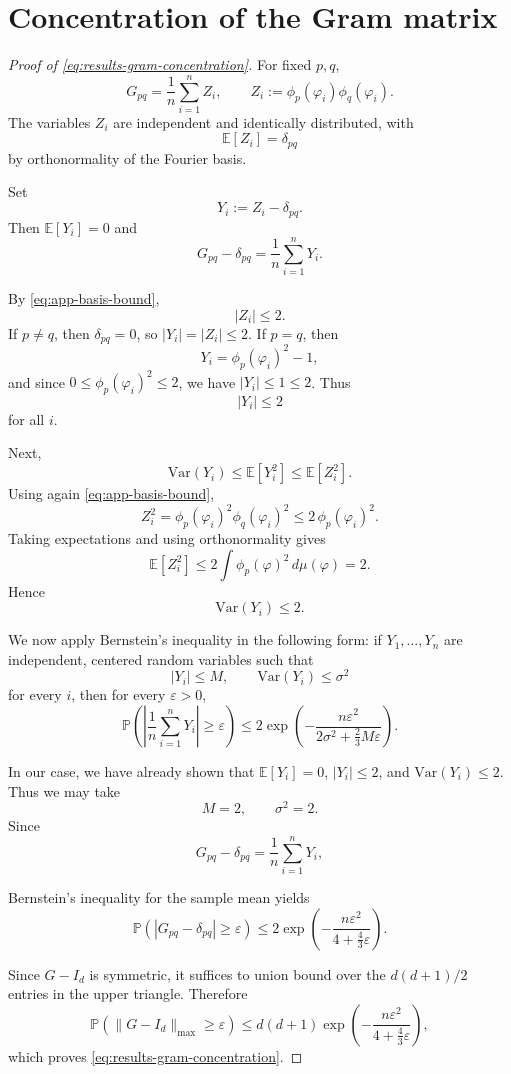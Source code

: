 \section{Concentration of the Gram matrix}
\label{sec:app-gram-proof}

\begin{proof}[Proof of \eqref{eq:results-gram-concentration}]
	For fixed \(p,q\),
	\[
		G_{pq}
		=
		\frac{1}{n}\sum_{i=1}^n Z_i,
		\qquad
		Z_i:=\phi_p(\varphi_i)\phi_q(\varphi_i).
	\]
	The variables \(Z_i\) are independent and identically distributed, with
	\[
		\mathbb E[Z_i]=\delta_{pq}
	\]
	by orthonormality of the Fourier basis.

	Set
	\[
		Y_i:=Z_i-\delta_{pq}.
	\]
	Then \(\mathbb E[Y_i]=0\) and
	\[
		G_{pq}-\delta_{pq}=\frac{1}{n}\sum_{i=1}^n Y_i.
	\]

	By \eqref{eq:app-basis-bound},
	\[
		|Z_i|\le 2.
	\]
	If \(p\neq q\), then \(\delta_{pq}=0\), so \(|Y_i|=|Z_i|\le 2\). If \(p=q\), then
	\[
		Y_i=\phi_p(\varphi_i)^2-1,
	\]
	and since \(0\le \phi_p(\varphi_i)^2\le 2\), we have \(|Y_i|\le 1\le 2\). Thus
	\[
		|Y_i|\le 2
	\]
	for all \(i\).

	Next,
	\[
		\mathrm{Var}(Y_i)\le \mathbb E[Y_i^2]\le \mathbb E[Z_i^2].
	\]
	Using again \eqref{eq:app-basis-bound},
	\[
		Z_i^2=\phi_p(\varphi_i)^2\phi_q(\varphi_i)^2\le 2\,\phi_p(\varphi_i)^2.
	\]
	Taking expectations and using orthonormality gives
	\[
		\mathbb E[Z_i^2]\le 2\int \phi_p(\varphi)^2\,d\mu(\varphi)=2.
	\]
	Hence
	\[
		\mathrm{Var}(Y_i)\le 2.
	\]

	We now apply Bernstein's inequality \cite{Vershynin_2018a} in the following form: if \(Y_1,\dots,Y_n\) are independent,
	centered random variables such that
	\[
		|Y_i|\le M,
		\qquad
		\mathrm{Var}(Y_i)\le \sigma^2
	\]
	for every \(i\), then for every \(\varepsilon>0\),
	\[
		\mathbb P\!\left(
		\left|\frac{1}{n}\sum_{i=1}^n Y_i\right|
		\ge \varepsilon
		\right)
		\le
		2\exp\!\left(
		-\frac{n\varepsilon^2}{2\sigma^2+\frac{2}{3}M\varepsilon}
		\right).
	\]

	In our case, we have already shown that \(\mathbb E[Y_i]=0\), \(|Y_i|\le 2\), and
	\(\mathrm{Var}(Y_i)\le 2\). Thus we may take
	\[
		M=2,
		\qquad
		\sigma^2=2.
	\]
	Since
	\[
		G_{pq}-\delta_{pq}=\frac{1}{n}\sum_{i=1}^n Y_i,
	\]

	Bernstein's inequality for the sample mean yields
	\[
		\mathbb P\!\left(|G_{pq}-\delta_{pq}|\ge \varepsilon\right)
		\le
		2\exp\!\left(
		-\frac{n\varepsilon^2}{4+\frac43\varepsilon}
		\right).
	\]

	Since \(G-I_d\) is symmetric, it suffices to union bound over the \(d(d+1)/2\) entries in
	the upper triangle. Therefore
	\[
		\mathbb P\!\left(\|G-I_d\|_{\max}\ge \varepsilon\right)
		\le
		d(d+1)\exp\!\left(
		-\frac{n\varepsilon^2}{4+\frac43\varepsilon}
		\right),
	\]
	which proves \eqref{eq:results-gram-concentration}.
\end{proof}

